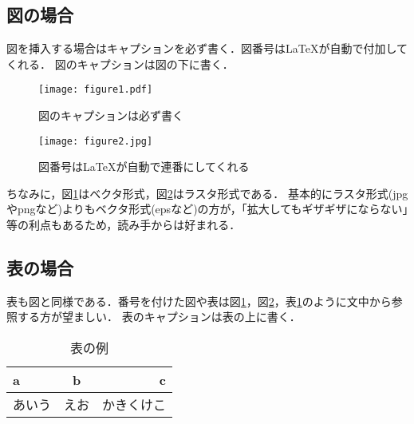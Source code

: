 \documentclass[11pt, a4paper]{jarticle}
\begin{document}
\subsection{図の場合}
図を挿入する場合はキャプションを必ず書く．図番号は\LaTeX が自動で付加してくれる．
図のキャプションは図の下に書く．


\begin{figure}[b] %
	\begin{center}
	\texttt{[image: figure1.pdf]} %
	\caption{図のキャプションは必ず書く} %
	\label{figure1} %
	\end{center}
\end{figure}
\begin{figure}[tb] %
	\begin{center}
	\texttt{[image: figure2.jpg]}
	\caption{図番号は\LaTeX が自動で連番にしてくれる}
	\label{figure2}
	\end{center}
\end{figure}
ちなみに，図\ref{figure1}はベクタ形式，図\ref{figure2}はラスタ形式である．
基本的にラスタ形式(jpgやpngなど)よりもベクタ形式(epsなど)の方が，「拡大してもギザギザにならない」等の利点もあるため，読み手からは好まれる．

\pagebreak %

\subsection{表の場合}
表も図と同様である．番号を付けた図や表は図\ref{figure1}，図\ref{figure2}，表\ref{table1}のように文中から参照する方が望ましい．
表のキャプションは表の上に書く．
\begin{table}[tb] %
	\caption{表の例}
	\label{table1}
	\begin{center}
	\begin{tabular}{| l | c | r |}
	\hline
	a & b & c \\ \hline
	あいう & えお & かきくけこ \\ \hline
	\end{tabular}
	\end{center}
\end{table}
\end{document}
